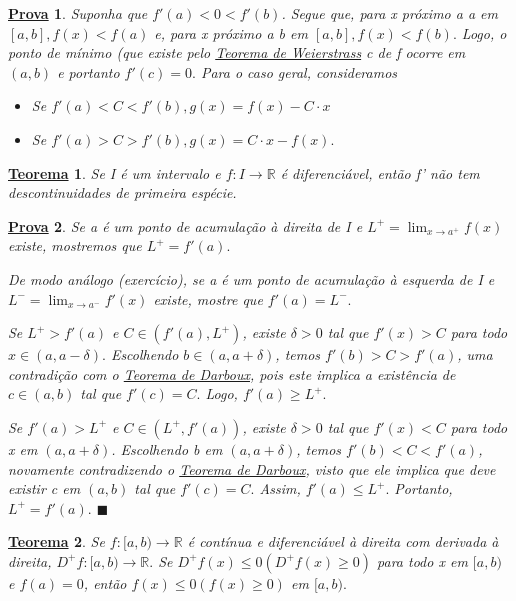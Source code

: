 \documentclass{article}
\newtheorem*{theorem*}{\underline{Teorema}}
\newtheorem*{proof*}{\underline{Prova}}
\renewcommand\qedsymbol{$\blacksquare$}
\begin{document}
\begin{proof*}
  Suponha que \(f'(a) < 0 < f'(b)\). Segue que, para x próximo a a em \([a, b], f(x) < f(a)\)
e, para x próximo a b em \([a, b], f(x) < f(b).\) Logo, o ponto de mínimo (que existe pelo
\hyperlink{weierstrass}{Teorema de Weierstrass} c de f ocorre em \((a, b)\) e 
portanto \(f'(c) = 0.\) Para o caso geral, consideramos 
\begin{itemize}
  \item Se \(f'(a) < C < f'(b), g(x) = f(x) - C \cdot x\)
  \item Se \(f'(a) > C > f'(b), g(x) = C \cdot x - f(x).\)
\end{itemize}
\end{proof*}
\begin{theorem*}
  Se I é um intervalo e \(f:I\rightarrow \mathbb{R}\) é diferenciável, então
  f' não tem descontinuidades de primeira espécie.
\end{theorem*}
\begin{proof*}
  Se a é um ponto de acumula\c cão à direita de I e \(L^{+}=\lim_{x\to a^{+}}f(x)\)
existe, mostremos que \(L^{+} = f'(a).\)

  De modo análogo (exercício), se a é um ponto de acumula\c cão à esquerda de I 
e \(L^{-}=\lim_{x\to a^{-}}f'(x)\) existe, mostre que \(f'(a) = L^{-}.\)

  Se \(L^{+} > f'(a)\) e \(C\in(f'(a), L^{+})\), existe \(\delta >0\) tal que
 \(f'(x) > C\) para todo \(x\in(a, a-\delta ).\) Escolhendo \(b\in(a, a+\delta )\),
 temos \(f'(b) > C > f'(a)\), uma contradi\c cão com o \hyperlink{darboux}{Teorema de Darboux},
 pois este implica a existência de \(c\in(a, b)\) tal que \(f'(c) = C.\) Logo,
 \(f'(a)\geq L^{+}.\)

  Se \(f'(a) > L^{+}\) e \(C\in(L^{+}, f'(a))\), existe \(\delta >0\) tal que 
 \(f'(x) < C\) para todo x em \((a, a+\delta )\). Escolhendo b em \((a, a+\delta )\),
 temos \(f'(b) < C < f'(a)\), novamente contradizendo o \hyperlink{darboux}{Teorema de Darboux},
 visto que ele implica que deve existir c em \((a, b)\) tal que \(f'(c) = C.\) Assim,
 \(f'(a)\leq L^{+}.\) Portanto, \(L^{+} = f'(a).\) \qedsymbol
\end{proof*}
\begin{theorem*}
  Se \(f:[a, b)\rightarrow \mathbb{R}\) é contínua e diferenciável à direita com 
derivada à direita, \(D^{+}f:[a, b)\rightarrow \mathbb{R}.\) Se \(D^{+}f(x)\leq 0 (D^{+}f(x)\geq 0)\)
para todo x em \([a, b)\) e \(f(a) = 0\), então \(f(x)\leq 0 (f(x)\geq 0)\) em \([a, b).\)
\end{theorem*}
\end{document}
